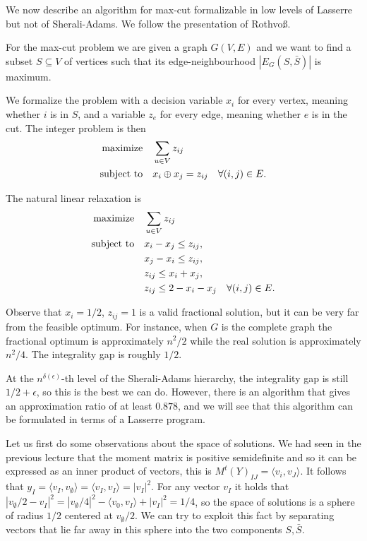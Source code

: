 \documentclass[a4paper,twoside,justified]{tufte-handout}
\begin{document}
We now describe an algorithm for max-cut formalizable in low levels of Lasserre but not of Sherali-Adams. We follow the presentation of Rothvoß\cite{rothvoss2013lasserre}.

For the max-cut problem we are given a graph $G(V,E)$ and we want to find a subset $S \subseteq V$ of vertices such that its edge-neighbourhood $|E_G(S,\bar S)|$ is maximum.

We formalize the problem with a decision variable $x_i$ for every vertex, meaning whether $i$ is in $S$, and a variable $z_e$ for every edge, meaning whether $e$ is in the cut. The integer problem is then
\begin{alignat}{2}
\label{eq:integer-max-cut}
  \text{maximize}\hspace{1em}& \sum_{u\in V} z_{ij}\notag \\
  \text{subject to}\hspace{1em}& x_i \oplus x_j = z_{ij} \quad \forall{(i,j)\in E}.
\end{alignat}

The natural linear relaxation is
\begin{alignat}{2}
\label{eq:max-cut}
  \text{maximize}\hspace{1em}& \sum_{u\in V} z_{ij}\notag \\
  \text{subject to}\hspace{1em}& x_i - x_j \leq z_{ij},\notag \\
& x_j - x_i \leq z_{ij},\notag \\
& z_{ij} \leq x_i + x_j,\notag \\
& z_{ij} \leq 2 - x_i - x_j \quad \forall{(i,j)\in E}.
\end{alignat}

Observe that $x_i=1/2$, $z_{ij}=1$ is a valid fractional solution, but it can be very far from the feasible optimum. For instance, when $G$ is the complete graph the fractional optimum is approximately $n^2/2$ while the real solution is approximately $n^2/4$. The integrality gap is roughly $1/2$.

At the $n^{\delta(\epsilon)}$-th level of the Sherali-Adams hierarchy, the integrality gap is still $1/2+\epsilon$, so this is the best we can do\cite{charikar2009integrality}. However, there is an algorithm\cite{goemans1995improved} that gives an approximation ratio of at least $0.878$, and we will see that this algorithm can be formulated in terms of a Lasserre program.

Let us first do some observations about the space of solutions. We had seen in the previous lecture that the moment matrix is positive semidefinite and so it can be expressed as an inner product of vectors, this is $M^t(Y)_{IJ}=\langle v_i, v_J \rangle$. It follows that $y_I=\langle v_I,v_\emptyset \rangle = \langle v_I,v_I \rangle = | v_I |^2$. For any vector $v_I$ it holds that $|v_\emptyset/2-v_I|^2=|v_\emptyset/4|^2-\langle v_0,v_I\rangle+|v_I|^2=1/4$, so the space of solutions is a sphere of radius $1/2$ centered at $v_\emptyset/2$. We can try to exploit this fact by separating vectors that lie far away in this sphere into the two components $S,\bar S$.
\end{document}
